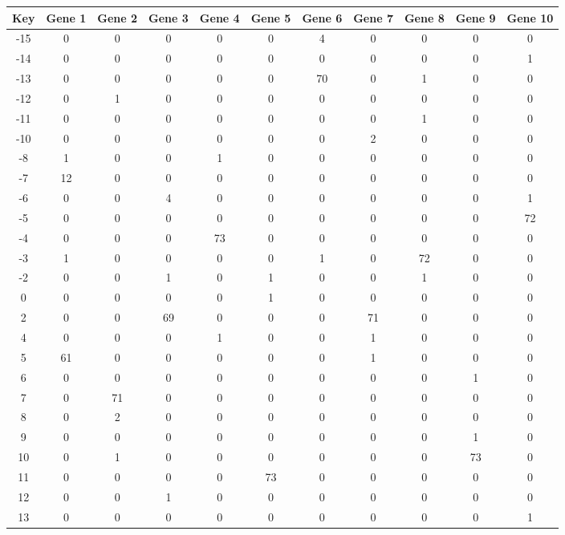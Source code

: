 \begin{tabular}{|c|c|c|c|c|c|c|c|c|c|c|}
\hline
Key & Gene 1 & Gene 2 & Gene 3 & Gene 4 & Gene 5 & Gene 6 & Gene 7 & Gene 8 & Gene 9 & Gene 10 \\
\hline
-15 & 0 & 0 & 0 & 0 & 0 & 4 & 0 & 0 & 0 & 0 \\
-14 & 0 & 0 & 0 & 0 & 0 & 0 & 0 & 0 & 0 & 1 \\
-13 & 0 & 0 & 0 & 0 & 0 & 70 & 0 & 1 & 0 & 0 \\
-12 & 0 & 1 & 0 & 0 & 0 & 0 & 0 & 0 & 0 & 0 \\
-11 & 0 & 0 & 0 & 0 & 0 & 0 & 0 & 1 & 0 & 0 \\
-10 & 0 & 0 & 0 & 0 & 0 & 0 & 2 & 0 & 0 & 0 \\
-8 & 1 & 0 & 0 & 1 & 0 & 0 & 0 & 0 & 0 & 0 \\
-7 & 12 & 0 & 0 & 0 & 0 & 0 & 0 & 0 & 0 & 0 \\
-6 & 0 & 0 & 4 & 0 & 0 & 0 & 0 & 0 & 0 & 1 \\
-5 & 0 & 0 & 0 & 0 & 0 & 0 & 0 & 0 & 0 & 72 \\
-4 & 0 & 0 & 0 & 73 & 0 & 0 & 0 & 0 & 0 & 0 \\
-3 & 1 & 0 & 0 & 0 & 0 & 1 & 0 & 72 & 0 & 0 \\
-2 & 0 & 0 & 1 & 0 & 1 & 0 & 0 & 1 & 0 & 0 \\
0 & 0 & 0 & 0 & 0 & 1 & 0 & 0 & 0 & 0 & 0 \\
2 & 0 & 0 & 69 & 0 & 0 & 0 & 71 & 0 & 0 & 0 \\
4 & 0 & 0 & 0 & 1 & 0 & 0 & 1 & 0 & 0 & 0 \\
5 & 61 & 0 & 0 & 0 & 0 & 0 & 1 & 0 & 0 & 0 \\
6 & 0 & 0 & 0 & 0 & 0 & 0 & 0 & 0 & 1 & 0 \\
7 & 0 & 71 & 0 & 0 & 0 & 0 & 0 & 0 & 0 & 0 \\
8 & 0 & 2 & 0 & 0 & 0 & 0 & 0 & 0 & 0 & 0 \\
9 & 0 & 0 & 0 & 0 & 0 & 0 & 0 & 0 & 1 & 0 \\
10 & 0 & 1 & 0 & 0 & 0 & 0 & 0 & 0 & 73 & 0 \\
11 & 0 & 0 & 0 & 0 & 73 & 0 & 0 & 0 & 0 & 0 \\
12 & 0 & 0 & 1 & 0 & 0 & 0 & 0 & 0 & 0 & 0 \\
13 & 0 & 0 & 0 & 0 & 0 & 0 & 0 & 0 & 0 & 1 \\
\hline
\end{tabular}